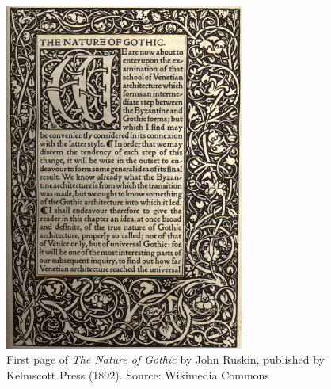 \begin{figure}[H]
\centering
\includegraphics[width=0.7\textwidth]{figures/chapter1/The_Nature_of_Gothic.jpg}
\caption{First page of \textit{The Nature of Gothic} by John Ruskin, published by Kelmscott Press (1892). Source: Wikimedia Commons}
\label{fig:nature_of_gothic_first_page}
\end{figure}


